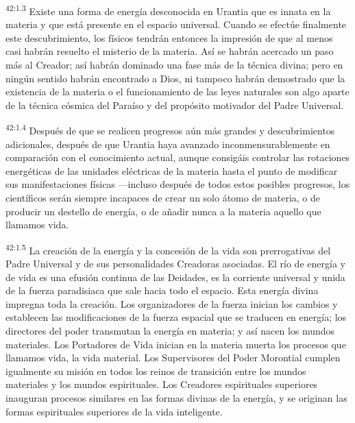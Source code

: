 \par
\textsuperscript{42:1.3} Existe una forma de energía desconocida en Urantia que es innata en la materia y que está presente en el espacio universal. Cuando se efectúe finalmente este descubrimiento, los físicos tendrán entonces la impresión de que al menos casi habrán resuelto el misterio de la materia. Así se habrán acercado un paso más al Creador; así habrán dominado una fase más de la técnica divina; pero en ningún sentido habrán encontrado a Dios, ni tampoco habrán demostrado que la existencia de la materia o el funcionamiento de las leyes naturales son algo aparte de la técnica cósmica del Paraíso y del propósito motivador del Padre Universal.

\par
\textsuperscript{42:1.4} Después de que se realicen progresos aún más grandes y descubrimientos adicionales, después de que Urantia haya avanzado inconmensurablemente en comparación con el conocimiento actual, aunque consigáis controlar las rotaciones energéticas de las unidades eléctricas de la materia hasta el punto de modificar sus manifestaciones físicas ---incluso después de todos estos posibles progresos, los científicos serán siempre incapaces de crear un solo átomo de materia, o de producir un destello de energía, o de añadir nunca a la materia aquello que llamamos vida.

\par
\textsuperscript{42:1.5} La creación de la energía y la concesión de la vida son prerrogativas del Padre Universal y de sus personalidades Creadoras asociadas. El río de energía y de vida es una efusión continua de las Deidades, es la corriente universal y unida de la fuerza paradisiaca que sale hacia todo el espacio. Esta energía divina impregna toda la creación. Los organizadores de la fuerza inician los cambios y establecen las modificaciones de la fuerza espacial que se traducen en energía; los directores del poder transmutan la energía en materia; y así nacen los mundos materiales. Los Portadores de Vida inician en la materia muerta los procesos que llamamos vida, la vida material. Los Supervisores del Poder Morontial cumplen igualmente su misión en todos los reinos de transición entre los mundos materiales y los mundos espirituales. Los Creadores espirituales superiores inauguran procesos similares en las formas divinas de la energía, y se originan las formas espirituales superiores de la vida inteligente.

